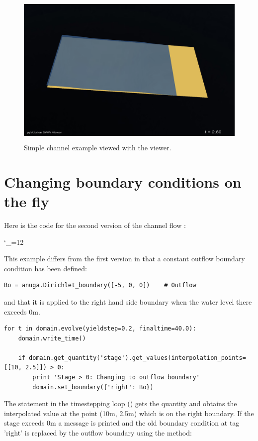 \documentclass{manual}
\newcommand{\verbatiminputB}[1]{%
\endgroup}
\def\verbatiminputunderscore{\begingroup 
\catcode`\_=12
\verbatiminputB}
\begin{document}
\begin{figure}[htp]
  \centerline{\includegraphics[height=75mm]
    {graphics/channel1.png}}%
  \caption{Simple channel example viewed with the \anuga viewer.}
  \label{fig:channel1}
\end{figure}



\section{Changing boundary conditions on the fly}
\label{sec:change boundary}

Here is the code for the second version of the channel flow :

\verbatiminputunderscore{../../anuga_core/examples/channel2.py}

This example differs from the first version in that a constant outflow boundary condition has
been defined:

\begin{verbatim}
Bo = anuga.Dirichlet_boundary([-5, 0, 0])    # Outflow
\end{verbatim}

and that it is applied to the right hand side boundary when the water level there exceeds 0m.

\begin{verbatim}
for t in domain.evolve(yieldstep=0.2, finaltime=40.0):
    domain.write_time()

    if domain.get_quantity('stage').get_values(interpolation_points=[[10, 2.5]]) > 0:
        print 'Stage > 0: Changing to outflow boundary'
        domain.set_boundary({'right': Bo})
\end{verbatim}

\label{sec:change boundary code}
The  statement in the timestepping loop () gets the quantity
 and obtains the interpolated value at the point (10m,
2.5m) which is on the right boundary. If the stage exceeds 0m a
message is printed and the old boundary condition at tag 'right' is
replaced by the outflow boundary using the method:
\end{document}
